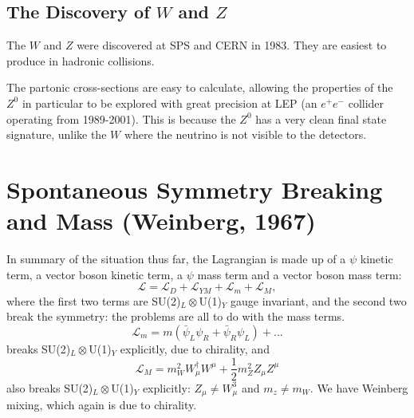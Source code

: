 \documentclass[a4paper,12pt]{article}
\begin{document}
\subsection{The Discovery of $W$ and $Z$}
%
The $W$ and $Z$ were discovered at SPS and CERN in 1983. They are easiest to produce in hadronic collisions.
\begin{figure}[!h]
  \centering
  \hfill
\end{figure}
The partonic cross-sections are easy to calculate, allowing the properties of the $Z^0$ in particular to be explored with great precision at LEP (an $e^+ e^-$ collider operating from 1989-2001). This is because the $Z^0$ has a very clean final state signature, unlike the $W$ where the neutrino is not visible to the detectors. 
%
\newpage
%
\section{Spontaneous Symmetry Breaking and Mass (Weinberg, 1967)}
%
In summary of the situation thus far, the Lagrangian is made up of a $\psi$ kinetic term, a vector boson kinetic term, a $\psi$ mass term and a vector boson mass term:
\begin{equation}
\mathcal{L} = \mathcal{L}_D + \mathcal{L}_{YM} + \mathcal{L}_m + \mathcal{L}_M,
\end{equation}
where the first two terms are SU(2)$_L \otimes$U(1)$_Y$ gauge invariant, and the
second two break the symmetry: the problems are all to do with the mass terms.
\begin{equation}
\mathcal{L}_m = m(\bar{\psi}_L \psi_R + \bar{\psi}_R \psi_L) + ...
\end{equation}
breaks SU(2)$_L \otimes$U(1)$_Y$ explicitly, due to chirality, and
\begin{equation}
\mathcal{L}_M = m_W^2W_\mu^\dagger W^\mu + \frac{1}{2}m_Z^2 Z_\mu Z^\mu 
\end{equation}
also breaks SU(2)$_L \otimes$U(1)$_Y$ explicitly: $Z_\mu \neq W_\mu^3$ and $m_z \neq m_W$. We have Weinberg mixing, which again is due to chirality. 
\end{document}
